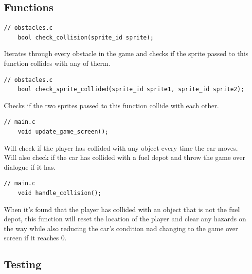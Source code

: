 \documentclass{article}
\begin{document}
\subsection*{Functions}
\begin{lstlisting}[style=CStyle]
	// obstacles.c
	bool check_collision(sprite_id sprite);
\end{lstlisting}
Iterates through every obstacle in the game and checks if the sprite passed to this function collides with any of therm.
\begin{lstlisting}[style=CStyle]
	// obstacles.c
	bool check_sprite_collided(sprite_id sprite1, sprite_id sprite2);
\end{lstlisting}
Checks if the two sprites passed to this function collide with each other.
\begin{lstlisting}[style=CStyle]
	// main.c
	void update_game_screen();
\end{lstlisting}
Will check if the player has collided with any object every time the car moves. Will also check if the car has collided with a fuel depot and throw the game over dialogue if it has.
\begin{lstlisting}[style=CStyle]
	// main.c
	void handle_collision();
\end{lstlisting}
When it's found that the player has collided with an object that is not the fuel depot, this function will reset the location of the player and clear any hazards on the way while also reducing the car's condition nad changing to the game over screen if it reaches 0.
\newpage

\subsection*{Testing}
\end{document}
